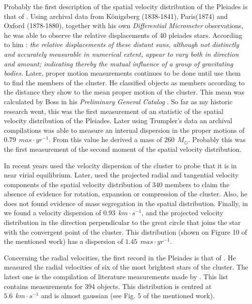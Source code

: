 Probably the first description of the spatial velocity distribution of the Pleiades is that of \citet{1884MNRAS..44..355P}. Using archival data from  Königsberg (1838-1841), Paris(1874) and Oxford (1878-1880), together with his own \emph{Differential Micrometer} observations, he was able to observe the relative displacements of 40 pleiades stars. According to him \citep{1884MNRAS..44..355P}: \textit{the relative displacements of these distant suns, although not distinctly and accurately measurable in numerical extent, appear to vary both in direction and amount; indicating thereby the mutual influence of a group of gravitating bodies.} Later, proper motion measurements continues to be done until \citet{Trumpler1921} use them to find the members of the cluster. He classified objects as members according to the distance they show to the mean proper motion of the cluster.  This mean was calculated by Boss in his \emph{Preliminary General Catalog} \citep{Trumpler1921}. So far as my historic research went, this was the first measurement of an statistic of the spatial velocity distribution of the Pleiades. Later \citet{1938AJ.....47...25T} using Trumpler's data an archival compilations was able to measure an internal dispersion in the proper motions of $0.79\ \ mas\cdot yr^{-1}$. From this value he derived a mass of $260\ \ M_{\odot}$. Probably this was the first measurement of the second moment of the spatial velocity distribution.

In recent years \citet{Pinfield1998} used the velocity dispersion of the cluster to probe that it is in near virial equilibrium. Later, \citet{2006ARep...50..714L} used the projected radial and tangential velocity components of the spatial velocity distribution of 340 members to claim the absence of evidence for rotation, expansion or compression of the cluster. Also, he does not found evidence of mass segregation in the spatial distribution. Finally, in \citet{Galli2017} we found a velocity dispersion of $0.93 \ \ km\cdot s^{-1}$, and the projected velocity distribution in the direction perpendicular to the great circle that joins the star with the convergent point of the cluster. This distribution (shown on Figure 10 of the mentioned work) has a dispersion of $1.45 \ \ mas\cdot yr^{-1}$. 

Concerning the radial velocities, the first record in the Pleiades is that of \citet{1904ApJ....19..338A}. He measured the radial velocities of six of the most brightest stars of the cluster. The latest one is the compilation of literature measurements made by \citet{Galli2017}. This list contains measurements for 394 objects. This distribution is centred at $5.6\ \ km \cdot s^{-1}$ and is almost gaussian (see Fig. 5 of the mentioned work). 

